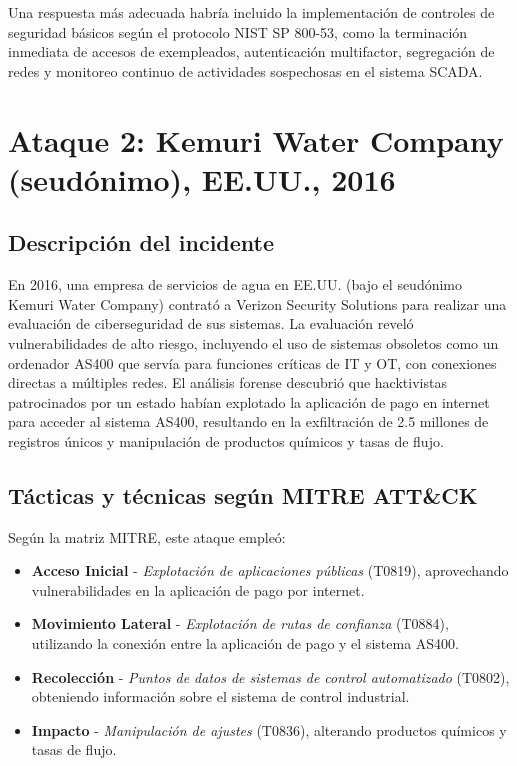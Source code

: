 Una respuesta más adecuada habría incluido la implementación de controles de seguridad básicos según el protocolo NIST SP 800-53, como la terminación inmediata de accesos de exempleados, autenticación multifactor, segregación de redes y monitoreo continuo de actividades sospechosas en el sistema SCADA.

\section{Ataque 2: Kemuri Water Company (seudónimo), EE.UU., 2016}

\subsection{Descripción del incidente}
En 2016, una empresa de servicios de agua en EE.UU. (bajo el seudónimo Kemuri Water Company) contrató a Verizon Security Solutions para realizar una evaluación de ciberseguridad de sus sistemas. La evaluación reveló vulnerabilidades de alto riesgo, incluyendo el uso de sistemas obsoletos como un ordenador AS400 que servía para funciones críticas de IT y OT, con conexiones directas a múltiples redes. El análisis forense descubrió que hacktivistas patrocinados por un estado habían explotado la aplicación de pago en internet para acceder al sistema AS400, resultando en la exfiltración de 2.5 millones de registros únicos y manipulación de productos químicos y tasas de flujo.

\subsection{Tácticas y técnicas según MITRE ATT\&CK}
Según la matriz MITRE, este ataque empleó:

\begin{itemize}
    \item \textbf{Acceso Inicial} - \textit{Explotación de aplicaciones públicas} (T0819), aprovechando vulnerabilidades en la aplicación de pago por internet.
    
    \item \textbf{Movimiento Lateral} - \textit{Explotación de rutas de confianza} (T0884), utilizando la conexión entre la aplicación de pago y el sistema AS400.
    
    \item \textbf{Recolección} - \textit{Puntos de datos de sistemas de control automatizado} (T0802), obteniendo información sobre el sistema de control industrial.
    
    \item \textbf{Impacto} - \textit{Manipulación de ajustes} (T0836), alterando productos químicos y tasas de flujo.
\end{itemize}

